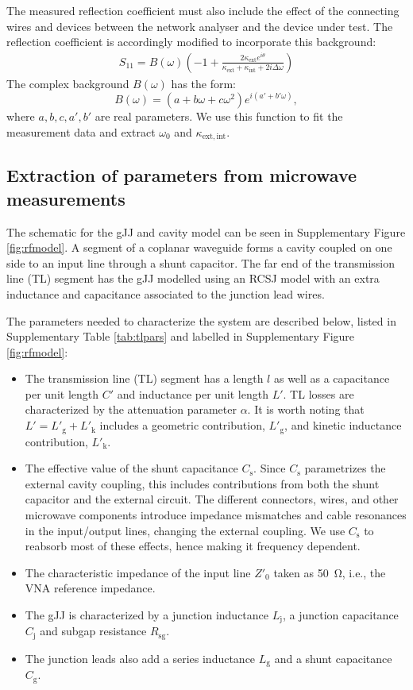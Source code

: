 The measured reflection coefficient must also include the effect of the connecting wires and devices between the network analyser and the device under test.
The reflection coefficient is accordingly modified to incorporate this background:
\begin{eqnarray}
S_{11} = B(\omega)\left(-1 + \frac{2\kappa_\mathrm{ext}e^{i\theta}}{\kappa_\mathrm{ext}+\kappa_\mathrm{int}+2i\Delta\omega}\right)
\end{eqnarray}
The complex background $B(\omega)$ has the form:
\begin{equation}
B(\omega) = (a+b\omega+c\omega^2)e^{i(a'+b'\omega)},
\end{equation}
where $a,b,c,a',b'$ are real parameters.  We use this function to fit the measurement data and extract $\omega_0$ and $\kappa_\mathrm{ext,int}$.

\subsection{Extraction of parameters from microwave measurements}\label{sec:extraction}
\noindent The schematic for the gJJ and cavity model can be seen in Supplementary Figure \ref{fig:rfmodel}.
A segment of a coplanar waveguide forms a cavity coupled on one side to an input line through a shunt capacitor.
The far end of the transmission line (TL) segment has the gJJ modelled using an RCSJ model with an extra inductance and capacitance associated to the junction lead wires.

The parameters needed to characterize the system are described below, listed in Supplementary Table \ref{tab:tlpars} and labelled in Supplementary Figure \ref{fig:rfmodel}:
\begin{itemize}
	\item The transmission line (TL) segment has a length $l$ as well as a capacitance per unit length $C'$ and inductance per unit length $L'$.
	TL losses are characterized by the attenuation parameter $\alpha$.
	It is worth noting that $L' = L'_\text{g} + L'_\text{k}$ includes a geometric contribution, $L'_\text{g}$, and kinetic inductance contribution\cite{vanduzer_principles_1999}, $L'_\text{k}$.
	\item The effective value of the shunt capacitance $C_\text{s}$.
	Since $C_\text{s}$ parametrizes the external cavity coupling, this includes contributions from both the shunt capacitor and the external circuit.
	The different connectors, wires, and other microwave components introduce impedance mismatches and cable resonances in the input/output lines, changing the external coupling.
	We use $C_\text{s}$ to reabsorb most of these effects, hence making it frequency dependent.
	\item The characteristic impedance of the input line $Z'_0$ taken as \SI{50}{\ohm}, i.e., the VNA reference impedance.
	\item The gJJ is characterized by a junction inductance $L_\text{j}$, a junction capacitance $C_\text{j}$ and subgap resistance $R_\text{sg}$.
	\item The junction leads also add a series inductance $L_\text{g}$ and a shunt capacitance $C_\text{g}$.
\end{itemize}

